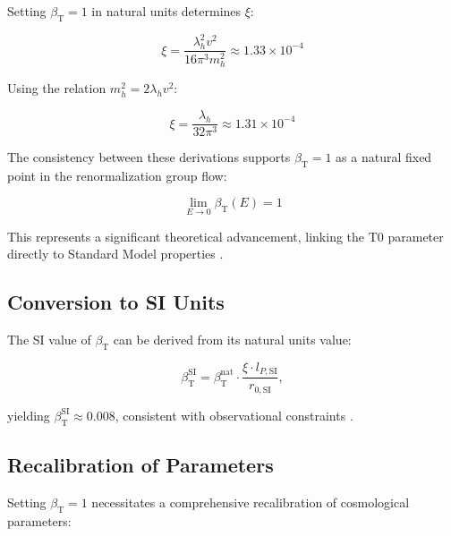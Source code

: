 \documentclass[12pt,a4paper]{article}
\newcommand{\betaT}{\beta_{\text{T}}}
\begin{document}
	Setting \(\betaT = 1\) in natural units determines \(\xi\):
	
	\begin{equation}
		\xi = \frac{\lambda_h^2 v^2}{16 \pi^3 m_h^2} \approx 1.33 \times 10^{-4}
		\label{eq:xi_determination}
	\end{equation}
	
	Using the relation \(m_h^2 = 2\lambda_h v^2\):
	
	\begin{equation}
		\xi = \frac{\lambda_h}{32 \pi^3} \approx 1.31 \times 10^{-4}
		\label{eq:xi_simplified}
	\end{equation}
	
	The consistency between these derivations supports \(\betaT = 1\) as a natural fixed point in the renormalization group flow:
	
	\begin{equation}
		\lim_{E \to 0} \betaT(E) = 1
		\label{eq:beta_fixed_point}
	\end{equation}
	
	This represents a significant theoretical advancement, linking the T0 parameter directly to Standard Model properties \cite{pascher_alphabeta_2025}.
	
	\subsection{Conversion to SI Units}
	\label{subsec:conversion_si}
	
	The SI value of \(\betaT\) can be derived from its natural units value:
	
	\begin{equation}
		\betaT^{\text{SI}} = \betaT^{\text{nat}} \cdot \frac{\xi \cdot l_{P,\text{SI}}}{r_{0,\text{SI}}},
		\label{eq:beta_conversion}
	\end{equation}
	
	yielding \(\betaT^{\text{SI}} \approx 0.008\), consistent with observational constraints \cite{pascher_alphabeta_2025}.
	
	\subsection{Recalibration of Parameters}
	\label{subsec:recalibration}
	
	Setting \(\betaT = 1\) necessitates a comprehensive recalibration of cosmological parameters:
	
\end{document}
